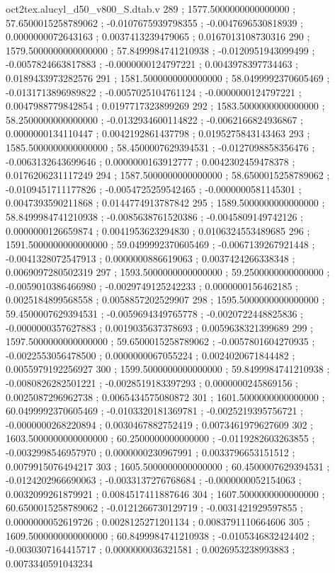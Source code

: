 \begin{filecontents}[overwrite]{oct2tex.alucyl_d50_v800_S.dtab.v}
289 ; 1577.5000000000000000 ; 57.6500015258789062 ; -0.0107675939798355 ; -0.0047696530818939 ; 0.0000000072643163 ; 0.0037413239479065 ; 0.0167013108730316
290 ; 1579.5000000000000000 ; 57.8499984741210938 ; -0.0120951943099499 ; -0.0057824663817883 ; -0.0000000124797221 ; 0.0043978397734463 ; 0.0189433973282576
291 ; 1581.5000000000000000 ; 58.0499992370605469 ; -0.0131713896989822 ; -0.0057025104761124 ; -0.0000000124797221 ; 0.0047988779842854 ; 0.0197717323899269
292 ; 1583.5000000000000000 ; 58.2500000000000000 ; -0.0132934600114822 ; -0.0062166824936867 ; 0.0000000134110447 ; 0.0042192861437798 ; 0.0195275843143463
293 ; 1585.5000000000000000 ; 58.4500007629394531 ; -0.0127098858356476 ; -0.0063132643699646 ; 0.0000000163912777 ; 0.0042302459478378 ; 0.0176206231117249
294 ; 1587.5000000000000000 ; 58.6500015258789062 ; -0.0109451711177826 ; -0.0054725259542465 ; -0.0000000581145301 ; 0.0047393590211868 ; 0.0144774913787842
295 ; 1589.5000000000000000 ; 58.8499984741210938 ; -0.0085638761520386 ; -0.0045809149742126 ; 0.0000000126659874 ; 0.0041953623294830 ; 0.0106324553489685
296 ; 1591.5000000000000000 ; 59.0499992370605469 ; -0.0067139267921448 ; -0.0041328072547913 ; 0.0000000886619063 ; 0.0037424266338348 ; 0.0069097280502319
297 ; 1593.5000000000000000 ; 59.2500000000000000 ; -0.0059010386466980 ; -0.0029749125242233 ; 0.0000000156462185 ; 0.0025184899568558 ; 0.0058857202529907
298 ; 1595.5000000000000000 ; 59.4500007629394531 ; -0.0059694349765778 ; -0.0020722448825836 ; -0.0000000357627883 ; 0.0019035637378693 ; 0.0059638321399689
299 ; 1597.5000000000000000 ; 59.6500015258789062 ; -0.0057801604270935 ; -0.0022553056478500 ; 0.0000000067055224 ; 0.0024020671844482 ; 0.0055979192256927
300 ; 1599.5000000000000000 ; 59.8499984741210938 ; -0.0080826282501221 ; -0.0028519183397293 ; 0.0000000245869156 ; 0.0025087296962738 ; 0.0065434575080872
301 ; 1601.5000000000000000 ; 60.0499992370605469 ; -0.0103320181369781 ; -0.0025219395756721 ; -0.0000000268220894 ; 0.0030467882752419 ; 0.0073461979627609
302 ; 1603.5000000000000000 ; 60.2500000000000000 ; -0.0119282603263855 ; -0.0032998546957970 ; 0.0000000230967991 ; 0.0033796653151512 ; 0.0079915076494217
303 ; 1605.5000000000000000 ; 60.4500007629394531 ; -0.0124202966690063 ; -0.0033137276768684 ; -0.0000000052154063 ; 0.0032099261879921 ; 0.0084517411887646
304 ; 1607.5000000000000000 ; 60.6500015258789062 ; -0.0121266730129719 ; -0.0031421929597855 ; 0.0000000052619726 ; 0.0028125271201134 ; 0.0083791110664606
305 ; 1609.5000000000000000 ; 60.8499984741210938 ; -0.0105346832424402 ; -0.0030307164415717 ; 0.0000000036321581 ; 0.0026953238993883 ; 0.0073340591043234

\end{filecontents}

